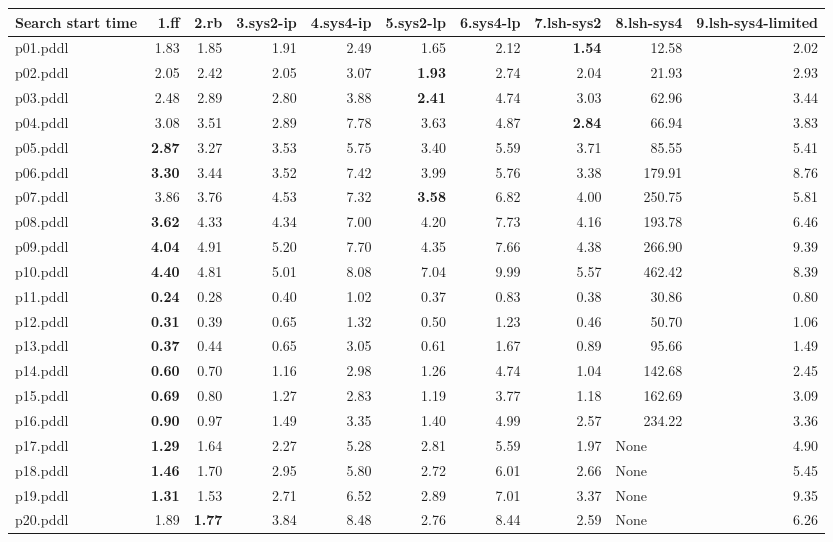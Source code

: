 \documentclass{article}
\begin{document}
\begin{tabular}{@{}lrrrrrrrrr@{}}
Search start time & 1.ff & 2.rb & 3.sys2-ip & 4.sys4-ip & 5.sys2-lp & 6.sys4-lp & 7.lsh-sys2 & 8.lsh-sys4 & 9.lsh-sys4-limited \\
\midrule
p01.pddl & 1.83 & 1.85 & 1.91 & 2.49 & 1.65 & 2.12 & \textbf{1.54} & 12.58 & 2.02 \\
p02.pddl & 2.05 & 2.42 & 2.05 & 3.07 & \textbf{1.93} & 2.74 & 2.04 & 21.93 & 2.93 \\
p03.pddl & 2.48 & 2.89 & 2.80 & 3.88 & \textbf{2.41} & 4.74 & 3.03 & 62.96 & 3.44 \\
p04.pddl & 3.08 & 3.51 & 2.89 & 7.78 & 3.63 & 4.87 & \textbf{2.84} & 66.94 & 3.83 \\
p05.pddl & \textbf{2.87} & 3.27 & 3.53 & 5.75 & 3.40 & 5.59 & 3.71 & 85.55 & 5.41 \\
p06.pddl & \textbf{3.30} & 3.44 & 3.52 & 7.42 & 3.99 & 5.76 & 3.38 & 179.91 & 8.76 \\
p07.pddl & 3.86 & 3.76 & 4.53 & 7.32 & \textbf{3.58} & 6.82 & 4.00 & 250.75 & 5.81 \\
p08.pddl & \textbf{3.62} & 4.33 & 4.34 & 7.00 & 4.20 & 7.73 & 4.16 & 193.78 & 6.46 \\
p09.pddl & \textbf{4.04} & 4.91 & 5.20 & 7.70 & 4.35 & 7.66 & 4.38 & 266.90 & 9.39 \\
p10.pddl & \textbf{4.40} & 4.81 & 5.01 & 8.08 & 7.04 & 9.99 & 5.57 & 462.42 & 8.39 \\
p11.pddl & \textbf{0.24} & 0.28 & 0.40 & 1.02 & 0.37 & 0.83 & 0.38 & 30.86 & 0.80 \\
p12.pddl & \textbf{0.31} & 0.39 & 0.65 & 1.32 & 0.50 & 1.23 & 0.46 & 50.70 & 1.06 \\
p13.pddl & \textbf{0.37} & 0.44 & 0.65 & 3.05 & 0.61 & 1.67 & 0.89 & 95.66 & 1.49 \\
p14.pddl & \textbf{0.60} & 0.70 & 1.16 & 2.98 & 1.26 & 4.74 & 1.04 & 142.68 & 2.45 \\
p15.pddl & \textbf{0.69} & 0.80 & 1.27 & 2.83 & 1.19 & 3.77 & 1.18 & 162.69 & 3.09 \\
p16.pddl & \textbf{0.90} & 0.97 & 1.49 & 3.35 & 1.40 & 4.99 & 2.57 & 234.22 & 3.36 \\
p17.pddl & \textbf{1.29} & 1.64 & 2.27 & 5.28 & 2.81 & 5.59 & 1.97 & \multicolumn{1}{|l|}{None} & 4.90 \\
p18.pddl & \textbf{1.46} & 1.70 & 2.95 & 5.80 & 2.72 & 6.01 & 2.66 & \multicolumn{1}{|l|}{None} & 5.45 \\
p19.pddl & \textbf{1.31} & 1.53 & 2.71 & 6.52 & 2.89 & 7.01 & 3.37 & \multicolumn{1}{|l|}{None} & 9.35 \\
p20.pddl & 1.89 & \textbf{1.77} & 3.84 & 8.48 & 2.76 & 8.44 & 2.59 & \multicolumn{1}{|l|}{None} & 6.26 \\
\end{tabular}
\end{document}
